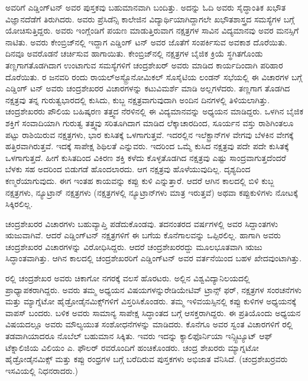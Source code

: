 ಅವರಿಗೆ ಎಡ್ಡಿಂಗ್‍ಟನ್ ಅವರ ಪುಸ್ತಕವು ಬಹುಮಾನವಾಗಿ ಬಂದಿತ್ತು. ಅದನ್ನು ಓದಿ ಅವರು ಸೈದ್ಧಾಂತಿಕ ಖಭೌತ ವಿಜ್ಞಾನದೆಡೆಗೆ ತಿರುಗಿದರು. ಅವರು ಪ್ರೆಸಿಡೆನ್ಸಿ ಕಾಲೇಜಿನ ವಿದ್ಯಾರ್ಥಿಯಾಗಿದ್ದಾಗಲೇ ಖಭೌತಶಾಸ್ತ್ರದ ಸಮಸ್ಯೆಗಳ ಬಗ್ಗೆ ಯೋಚಿಸುತ್ತಿದ್ದರು. ಅವರು ಇಂಗ್ಲೆಂಡಿಗೆ ಪಯಣ ಮಾಡುತ್ತಿರುವಾಗ ನಕ್ಷತ್ರಗಳ ಸಾವಿನ ವಿದ್ಯಮಾನವು ಅವರ ಮನಸ್ಸಿಗೆ ನಾಟಿತು. ಅವರು ಕೇಂಬ್ರಿಜ್‍ನಲ್ಲಿ ಇದ್ದಾಗ ಎಡ್ಡಿಂಗ್ ಟನ್ ಅವರ ಜೊತೆಗೆ ಸಂಪರ್ಕಿಸುವ ಅವಕಾಶ ದೊರೆಯಿತು. ದಿನವೂ ಅವರೊಡನೆ ಚರ್ಚಿಸುವ ಹಾಗಾಯಿತು. ಕೇಂಬ್ರಿಜ್‍ನಲ್ಲಿ ನಕ್ಷತ್ರಗಳ ಬೈಜಿಕ ಕ್ರಿಯೆ ಸ್ಥಗಿತಗೊಂಡು ತಣ್ಣಗಾಗತೊಡಗಿದಾಗ ಉಂಟಾಗುವ ಸಮಸ್ಯೆಗಳಿಗೆ ಚಂದ್ರಶೇಖರ್ ಅವರು ಮಾಡಿದ ಕಾರ್ಯದಿಂದಾಗಿ ಪರಿಹಾರ ದೊರೆಯಿತು. ರ ಜನವರಿ ರಂದು ರಾಯಲ್\break ಅಸ್ಟ್ರೊನೋಮಿಕಲ್ ಸೊಸೈಟಿಯ ಲಂಡನ್ ಸಭೆಯಲ್ಲಿ ಈ ವಿಚಾರಗಳ ಬಗ್ಗೆ ಎಡ್ಡಿಂಗ್ ಟನ್ ಅವರು ಚಂದ್ರಶೇಖರರ ವಿಚಾರಗಳನ್ನು ಕಟುವಿಮರ್ಶೆ ಮಾಡಿ ಅಲ್ಲಗಳೆದರು. ತಣ್ಣಗಾಗ ತೊಡಗಿದ ನಕ್ಷತ್ರವು ತನ್ನ ಗುರುತ್ವಭಾರದಲ್ಲಿ ಕುಸಿದು, ಕುಬ್ಜ ನಕ್ಷತ್ರವಾಗುವುದಾಗಿ ಅಂದಿನ ದಿನಗಳಲ್ಲಿ ತಿಳಿಯಲಾಗಿತ್ತು. ಚಂದ್ರಶೇಖರರು ಪೌಲಿಯ ಬಹಿಷ್ಕರಣ ತತ್ತ್ವದ ನೆರಳಿನಲ್ಲಿ ಈ ವಿದ್ಯಮಾನವನ್ನು ಅಧ್ಯಯನ ಮಾಡಿದ್ದರು. ಒಳಗಿನ ಬೈಜಿಕ ಶಕ್ತಿಗೆ ಸಂವಾದಿಯಾಗಿ ಗುರುತ್ವ ತತ್ತ್ವವು ಸರಿತೂಗಿದಾಗ ಮಾಡಿದ ಲೆಕ್ಕಾಚಾರದಿಂದ, ಸೂರ್ಯನ ವಸ್ತು ರಾಶಿಗಿಂತಲೂ  ಪಟ್ಟು ರಾಶಿಯಿರುವ ನಕ್ಷತ್ರಗಳು, ಭಾರ ಕುಸಿತಕ್ಕೆ ಒಳಗಾಗುತ್ತವೆ. ಇದರಲ್ಲಿನ ಇಲೆಕ್ಟ್ರಾನ್‍ಗಳ ವೇಗವು ಬೆಳಕಿನ ವೇಗಕ್ಕೆ ಹತ್ತಿರವಾಗಿರುತ್ತವೆ. ಇದಕ್ಕೆ ಸಾಪೇಕ್ಷ ಶಿಥಿಲತೆ ಎನ್ನುವರು. ಇದರಿಂದ ಒಮ್ಮೆ ಕುಸಿದ ನಕ್ಷತ್ರವು ಪದೇ ಪದೇ ಕುಸಿತಕ್ಕೆ ಒಳಗಾಗುತ್ತದೆ. ಹೀಗೆ ಕುಸಿತದಿಂದ ವಿಕಿರಣ ಶಕ್ತಿ ಕಳೆದು ಕೊಳ್ಳತೊಡಗಿದ ನಕ್ಷತ್ರವು ಎಷ್ಟು ಸಾಂದ್ರವಾಗುತ್ತದೆಂದರೆ ಬೆಳಕು ಸಹ ಅದರಿಂದ ಬಿಡುಗಡೆ ಹೊಂದಲಾರದು. ಆಗ ನಕ್ಷತ್ರವು ಹೊಳೆಯುವುದಿಲ್ಲ. ದೃಶ್ಯದಿಂದ ಕಣ್ಮರೆಯಾಗುವುದು. ಈಗ ಇಂತಹ ಕಾಯವನ್ನು ಕಪ್ಪು ಕುಳಿ ಎನ್ನುತ್ತಾರೆ. ಆದರೆ ಆಗಿನ ಕಾಲದಲ್ಲಿ ಬಿಳಿ ಕುಬ್ಜ ನಕ್ಷತ್ರಗಳು, ನ್ಯೂಟ್ರಾನ್ ನಕ್ಷತ್ರಗಳು (ನಕ್ಷತ್ರಗಳಲ್ಲಿ ನ್ಯೂಟ್ರಾನ್‍ಗಳು ಮಾತ್ರ ಇರುತ್ತವೆ) ಅಥವಾ ಕಪ್ಪುಕುಳಿಗಳು ನೋಟಕ್ಕೆ ಸಿಕ್ಕಿರಲಿಲ್ಲ.

ಚಂದ್ರಶೇಖರರ ವಿಚಾರಗಳು ಬಹುವ್ಯಾಪ್ತಿ ಪಡೆದುಕೊಂಡವು. ತದನಂತರದ ವರ್ಷಗಳಲ್ಲಿ ಅವರ ಸಿದ್ದಾಂತಗಳು ಋಜುವಾಗಿವೆ. ಆದರೆ ಎಡ್ಡಿಂಗ್‍ಟನ್ ನಕ್ಷತ್ರಗಳಿಗೆ ಈ ಬಗೆಯ ಕೊನೆಗಾಲವನ್ನು ಒಪ್ಪಿರಲಿಲ್ಲ. ಹಾಗಾಗಿ ಅವರು ಚಂದ್ರಶೇಖರರ ವಿಚಾರಗಳನ್ನು ವಿರೋಧಿಸಿದ್ದರು. ಆದರೆ ಚಂದ್ರಶೇಖರರದ್ದು ಮೂಲಭೂತವಾಗಿ ಋಜು ಸಿದ್ಧಾಂತವಾಗಿತ್ತು. ಆಗಿನ ಕಾಲದಲ್ಲಿ ಚಂದ್ರಶೇಖರರಿಗೆ ಎಡ್ಡಿಂಗ್‍ಟನ್ ಅವರ ವರ್ತನೆಯಿಂದ ಬಹಳ ಖೇದವುಂಟಾಗಿತ್ತು.

ರಲ್ಲಿ ಚಂದ್ರಶೇಖರ ಅವರು ಚಿಕಾಗೋ ನಗರಕ್ಕೆ ವಲಸೆ ಹೊರಟರು. ಅಲ್ಲಿನ ವಿಶ್ವವಿದ್ಯಾನಿಲಯದಲ್ಲಿ ಪ್ರಾಧ್ಯಾಪಕರಾಗಿದ್ದರು. ಅವರು ತಮ್ಮ ಅಧ್ಯಯನ ವಿಷಯಗಳನ್ನು\break ರೇಡಿಯೇಟಿವ್ ಟ್ರಾನ್ಸ್ ಫರ್, ನಕ್ಷತ್ರಗಳ ಸಂರಚನೆಗಳು ಮತ್ತು ಮ್ಯಾಗ್ನೆಟೋ ಹೈಡ್ರೋಡೈನಮಿಕ್ಸ್‌ಗಳಿಗೆ ವಿಸ್ತರಿಸಿಕೊಂಡರು. ತಮ್ಮ ಇಳಿವಯಸ್ಸಿನಲ್ಲಿ ಕಪ್ಪು ಕುಳಿಗಳ ಅಧ್ಯಯನಕ್ಕೆ ವಾಪಸ್ ಬಂದರು. ಬಳಿಕ ಅವರು ಸಾಮಾನ್ಯ ಸಾಪೇಕ್ಷ ಸಿದ್ಧಾಂತದ ಬಗ್ಗೆ ಆಸಕ್ತರಾಗಿದ್ದರು. ಈ ಪ್ರತಿಯೊಂದು ಅಧ್ಯಯನ ವಿಷಯದಲ್ಲೂ ಅವರು ಮೌಲ್ಯಯುತ ಸಂಶೋಧನೆಗಳನ್ನು ಮಾಡಿದರು. ಕೊನೆಗೂ ಅವರ ಸ್ವಂತ ವಿಚಾರಗಳಿಗೆ ರಲ್ಲಿ ತಡವಾಗಿಯಾದರೂ ನೊಬೆಲ್ ಬಹುಮಾನ ಸಿಕ್ಕಿತು. ಇವರು ಇದನ್ನು ಕ್ಯಾಲಿಫೊರ್ನಿಯಾ ಇನ್ಸ್ಟಿಟ್ಯೂಟ್ ಆಫ್ ಟೆಕ್ನಾಲಿಜಿಯ ವಿಲಿಯಂ ಎ. ಫೌಲರ್ ರವರೊಂದಿಗೆ ಹಂಚಿಕೊಂಡರು. ಚಂದ್ರ ಶೇಖರರು ಮ್ಯಾಗ್ನಟೋ ಹೈಡ್ರೋಡೈನಮಿಕ್ಸ್ ಮತ್ತು ಕಪ್ಪು ರಂಧ್ರಗಳ ಬಗ್ಗೆ ಬರೆದಿರುವ ಪುಸ್ತಕಗಳು ಅಭಿಜಾತ ವೆನಿಸಿದೆ. (ಚಂದ್ರಶೇಖರ್‍ರವರು  ಇಸವಿಯಲ್ಲಿ ನಿಧನರಾದರು.)

